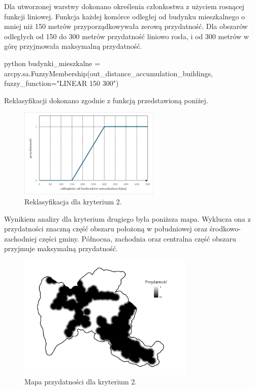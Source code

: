 \documentclass{article}
\begin{document}
Dla utworzonej warstwy dokonano określenia członkostwa z użyciem rosnącej funkcji liniowej. Funkcja każdej komórce odległej od budynku mieszkalnego o mniej niż 150 metrów przyporządkowywała zerową przydatność. Dla obszarów odległych od 150 do 300 metrów przydatność liniowo rosła, i od 300 metrów w górę przyjmowała maksymalną przydatność.
\vspace{5pt}

\begin{mintedbox}{python}
budynki_mieszkalne = arcpy.sa.FuzzyMembership(out_distance_accumulation_buildings, fuzzy_function="LINEAR 150 300")
\end{mintedbox}
\vspace{10pt}

Reklasyfikacji dokonano zgodnie z funkcją przedstawioną poniżej.
\vspace{5pt}

\begin{figure}[H]
    \centering
    \includegraphics[width=0.6\textwidth]{img/kryterium2-wykres-glowny.png}
    \caption*{Reklasyfikacja dla kryterium 2.}
\end{figure}

\newpage

Wynikiem analizy dla kryterium drugiego była poniższa mapa. Wyklucza ona z przydatności znaczną część obszaru położoną w południowej oraz środkowo-zachodniej części gminy. Północna, zachodnia oraz centralna część obszaru przyjmuje maksymalną przydatność.
\vspace{5pt}

\begin{figure}[H]
    \centering
    \includegraphics[width=0.75\textwidth]{img/kryterium2-layout.jpg}
    \caption{Mapa przydatności dla kryterium 2.}
\end{figure}
\vspace{10pt}
\end{document}
